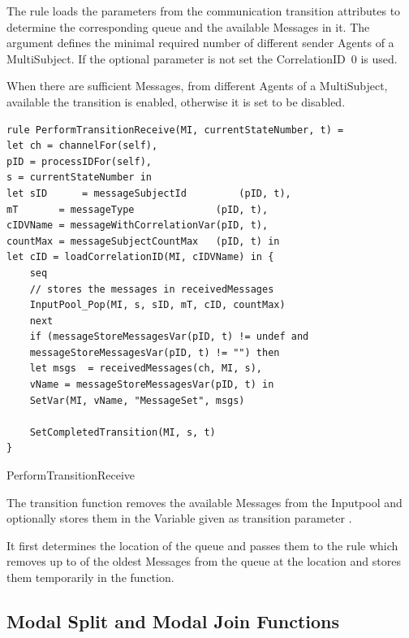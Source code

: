 The  rule loads the parameters from the communication transition attributes
to determine the corresponding queue and the available Messages in it. The
 argument defines the minimal required
number of different sender Agents of a MultiSubject. If the optional
parameter  is not set the
CorrelationID~0 is used.

When there are sufficient Messages, from different Agents of a MultiSubject,
available the transition is enabled, otherwise it is set to be disabled.

\begin{listing}[H]
	\begin{verbatim}
rule PerformTransitionReceive(MI, currentStateNumber, t) =
let ch = channelFor(self),
pID = processIDFor(self),
s = currentStateNumber in
let sID      = messageSubjectId         (pID, t),
mT       = messageType              (pID, t),
cIDVName = messageWithCorrelationVar(pID, t),
countMax = messageSubjectCountMax   (pID, t) in
let cID = loadCorrelationID(MI, cIDVName) in {
	seq
	// stores the messages in receivedMessages
	InputPool_Pop(MI, s, sID, mT, cID, countMax)
	next
	if (messageStoreMessagesVar(pID, t) != undef and
	messageStoreMessagesVar(pID, t) != "") then
	let msgs  = receivedMessages(ch, MI, s),
	vName = messageStoreMessagesVar(pID, t) in
	SetVar(MI, vName, "MessageSet", msgs)
	
	SetCompletedTransition(MI, s, t)
}
	\end{verbatim}
	\caption{PerformTransitionReceive}
	\label{lst:shortasm:PerformTransitionReceive}
\end{listing}

The transition function removes the available Messages from the Inputpool and
optionally stores them in the Variable given as transition parameter
.

It first determines the location of the queue and passes them to the
 rule which removes up to 
of the oldest Messages from the queue at the location
and stores them temporarily in the  function.

\subsection{Modal Split and Modal Join Functions}

